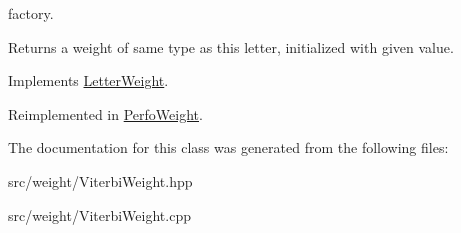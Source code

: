 factory. 

\begin{DoxyReturn}{Returns}
a weight of same type as this letter, initialized with given value. 
\end{DoxyReturn}


Implements \mbox{\hyperlink{classLetterWeight_af1f898e0845f59299440fc50a58fd2f1}{Letter\+Weight}}.



Reimplemented in \mbox{\hyperlink{classPerfoWeight_ad9237d9b3fccf6f0b70133e10c1103b2}{Perfo\+Weight}}.



The documentation for this class was generated from the following files\+:\begin{DoxyCompactItemize}
\item 
src/weight/Viterbi\+Weight.\+hpp\item 
src/weight/Viterbi\+Weight.\+cpp\end{DoxyCompactItemize}
